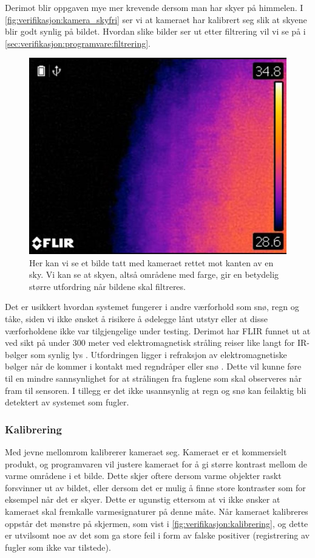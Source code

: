 Derimot blir oppgaven mye mer krevende dersom man har skyer på himmelen. I \autoref{fig:verifikasjon:kamera_skyfri} ser vi at kameraet har kalibrert seg slik at skyene blir godt synlig på bildet. Hvordan slike bilder ser ut etter filtrering vil vi se på i \autoref{sec:verifikasjon:programvare:filtrering}.

\begin{figure}[H]
    \centering
    \includegraphics[width=.5\textwidth]{verifikasjon-test/Kamera/skyer3.JPG}
    \caption{Her kan vi se et bilde tatt med kameraet rettet mot kanten av en sky. Vi kan se at skyen, altså områdene med farge, gir en betydelig større utfordring når bildene skal filtreres.}
    \label{fig:verifikasjon:kamera_skyer}
\end{figure}

Det er usikkert hvordan systemet fungerer i andre værforhold som snø, regn og tåke, siden vi ikke ønsket å risikere å ødelegge lånt utstyr eller  at disse værforholdene ikke var tilgjengelige under testing.
Derimot har FLIR funnet ut at ved sikt på under 300 meter ved elektromagnetisk stråling reiser like langt for IR-bølger som synlig lys \cite{tåke}.
Utfordringen ligger i refraksjon av elektromagnetiske bølger når de kommer i kontakt med regndråper eller snø \cite{refraksjon}.
Dette vil kunne føre til en mindre sannsynlighet for at strålingen fra fuglene  som skal observeres når fram til sensoren. I tillegg er det ikke usannsynlig at regn og snø kan feilaktig bli detektert av systemet som fugler. 


\subsubsection{Kalibrering}\label{sec:verifikasjon:kamera:kalibrering}

Med jevne mellomrom kalibrerer kameraet seg. 
Kameraet er et kommersielt produkt, og programvaren vil justere kameraet for å gi større kontrast mellom de varme områdene i et bilde. 
Dette skjer oftere dersom varme objekter raskt forsvinner ut av bildet, eller dersom det er mulig å finne store kontraster som for eksempel når det er skyer. 
Dette er ugunstig ettersom at vi ikke ønsker at kameraet skal fremkalle varmesignaturer på denne måte. 
Når kameraet kalibreres oppstår det mønstre på skjermen, som vist i \autoref{fig:verifikasjon:kalibrering}, og dette er utvilsomt noe av det som ga store feil i form av falske positiver (registrering av fugler som ikke var tilstede). 

